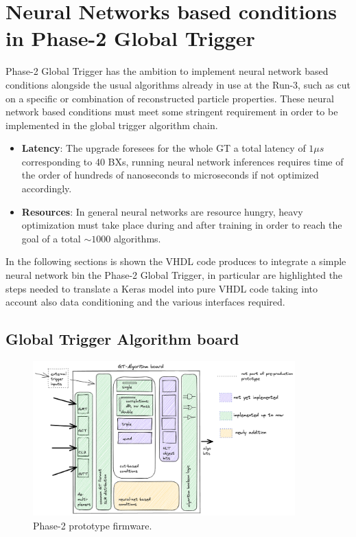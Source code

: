 \documentclass[../../main.tex]{subfiles}
\begin{document}
\chapter{Neural Networks based conditions in Phase-2 Global Trigger}
\label{sec:P2GT}

Phase-2 Global Trigger has the ambition to implement neural network based conditions alongside the usual algorithms already in use at the Run-3, such as cut on a specific or combination of reconstructed particle properties. These neural network based conditions must meet some stringent requirement in order to be implemented in the global trigger algorithm chain.  
\begin{itemize}
    \item \textbf{Latency}: The upgrade foresees for the whole GT a total latency of $1\mu s$ corresponding to 40 BXs, running neural network inferences requires time of the order of hundreds of nanoseconds to microseconds if not optimized accordingly.
    \item \textbf{Resources}: In general neural networks are resource hungry, heavy optimization must take place during and after training in order to reach the goal of a total $\sim1000$ algorithms.  
\end{itemize}

In the following sections is shown the VHDL code produces to integrate a simple neural network bin the Phase-2 Global Trigger, in particular are highlighted the steps needed to translate a Keras model into pure VHDL code taking into account also data conditioning and the various interfaces required.

\section{Global Trigger Algorithm board}
\label{sec:Gt-algo-board}

\begin{figure}[h]
    \centering
    \includegraphics[width=0.90\textwidth]{sections/05/Images/GT-algo.png}
    \caption{Phase-2 prototype firmware.}
    \label{fig:P2GT}
\end{figure}  
\end{document}
